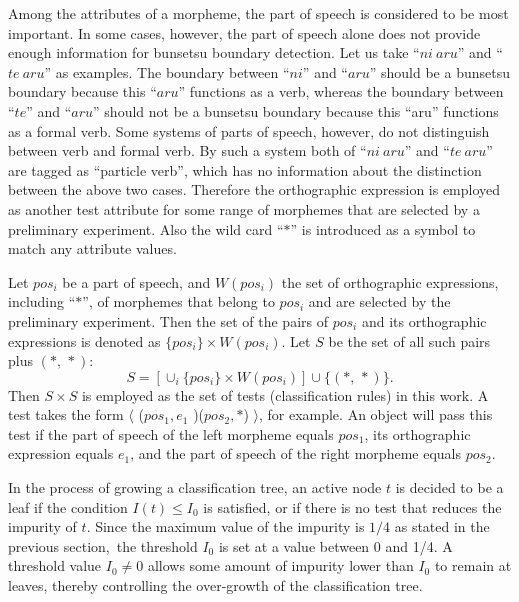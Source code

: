 Among the attributes of a morpheme, the part of speech is considered
to be
most important. In some cases, however, the part  of speech alone does
not provide enough information
for bunsetsu boundary detection.
Let us take ``$ni\ aru$'' and ``$te\ aru$'' as examples. The boundary
between ``$ni$'' and ``$aru$'' should be a bunsetsu boundary because 
this ``$aru$''  functions as a verb, whereas  the boundary
between ``$te$'' and ``$aru$'' should not be a bunsetsu boundary because
this  ``aru''  functions as a formal  verb. Some systems of
parts of speech, however, do not distinguish between verb and
formal verb. By such a system both of ``$ni\ aru$'' and ``$te\ aru$''
are tagged as ``particle verb'', which has no information 
about the distinction between the above two cases.
Therefore the orthographic
expression is employed as another test attribute for some range of
morphemes
that are selected by a preliminary experiment. Also the wild card
``$*$'' is introduced as a symbol to match any attribute values. 

Let $pos_{i}$ be a part of speech, and $W(pos_{i})$ the set of
orthographic expressions, including ``$*$'', of morphemes that belong
to $pos_{i}$ and are selected by the preliminary experiment.
Then the set of the pairs of $pos_{i}$ and its orthographic expressions
is
 denoted as $\{pos_{i}\}\times W(pos_{i})$. Let $S$ be the set of all such 
pairs
plus $(*,\,*)$:
\begin{displaymath}
S= [ \cup_{i} \{pos_{i}\}\times W(pos_{i})] \cup \{(*,\,*)\}.
\end{displaymath}
Then $S\times S$  is employed as the set of tests (classification rules)  in this work.
A test takes the form 
$\langle $ ($pos_{1}, e_{1}$ )($pos_{2}, *$) $\rangle $, for example.
An object will pass this test
if the part of speech of the left morpheme  
 equals $pos_{1}$, its orthographic
expression equals $e_{1}$, and the part of speech of the right
morpheme
equals $pos_{2}$.

In the process of growing a classification tree,
 an active node $t$ is decided to be a
leaf if the condition $I(t) \leq I_0$ is satisfied,
 or if there is no test that reduces the impurity
of $t$. Since the maximum value of the impurity is $1/4$ as stated in
the previous section,\ the
threshold $I_0$ is set at a value  between 0 and 1/4.
A threshold value  $I_0 \neq 0 $ allows  some amount of impurity
lower than $I_0$ to remain at leaves, thereby controlling  the over-growth of 
the classification tree.

